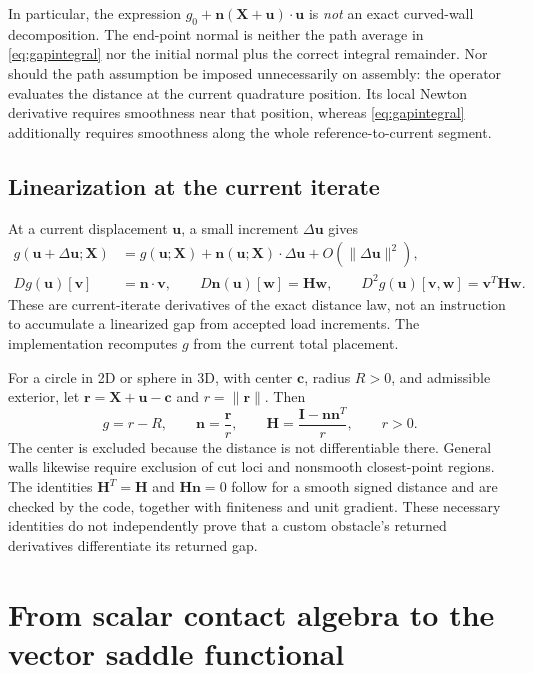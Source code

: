 \documentclass[preprint,11pt]{elsarticle}
\numberwithin{equation}{section}
\newcommand{\bu}{\boldsymbol{u}}
\newcommand{\bv}{\boldsymbol{v}}
\newcommand{\bw}{\boldsymbol{w}}
\newcommand{\bX}{\boldsymbol{X}}
\newcommand{\bn}{\boldsymbol{n}}
\newcommand{\bH}{\boldsymbol{H}}
\newcommand{\bI}{\boldsymbol{I}}
\begin{document}
In particular, the expression $g_0+\bn(\bX+\bu)\cdot\bu$ is
\emph{not} an exact curved-wall decomposition. The end-point normal is
neither the path average in \eqref{eq:gapintegral} nor the initial
normal plus the correct integral remainder. Nor should the path assumption
be imposed unnecessarily on assembly: the operator evaluates the distance
at the current quadrature position. Its local Newton derivative requires
smoothness near that position, whereas \eqref{eq:gapintegral} additionally
requires smoothness along the whole reference-to-current segment.

\subsection{Linearization at the current iterate}
At a current displacement $\bu$, a small increment $\Delta\bu$ gives
\begin{align}
 g(\bu+\Delta\bu;\bX)
  &=g(\bu;\bX)+\bn(\bu;\bX)\cdot\Delta\bu
       +O(\|\Delta\bu\|^2),\label{eq:gapnewton}\\
 Dg(\bu)[\bv]&=\bn\cdot\bv,\qquad
 D\bn(\bu)[\bw]=\bH\bw,\qquad
 D^2g(\bu)[\bv,\bw]=\bv^T\bH\bw.
 \label{eq:gapderivatives}
\end{align}
These are current-iterate derivatives of the exact distance law, not an
instruction to accumulate a linearized gap from accepted load increments.
The implementation recomputes $g$ from the current total placement.

For a circle in 2D or sphere in 3D, with center $\boldsymbol{c}$,
radius $R>0$, and admissible exterior, let
$\boldsymbol{r}=\bX+\bu-\boldsymbol{c}$ and $r=\|\boldsymbol{r}\|$.
Then
\begin{equation}
 g=r-R,\qquad \bn=\frac{\boldsymbol{r}}r,\qquad
 \bH=\frac{\bI-\bn\bn^T}{r},\qquad r>0.
 \label{eq:sphere}
\end{equation}
The center is excluded because the distance is not differentiable there.
General walls likewise require exclusion of cut loci and nonsmooth
closest-point regions. The identities $\bH^T=\bH$ and $\bH\bn=0$
follow for a smooth signed distance and are checked by the code, together
with finiteness and unit gradient. These necessary identities do not
independently prove that a custom obstacle's returned derivatives
differentiate its returned gap.

\section{From scalar contact algebra to the vector saddle functional}
\label{sec:adaptation}
\end{document}
